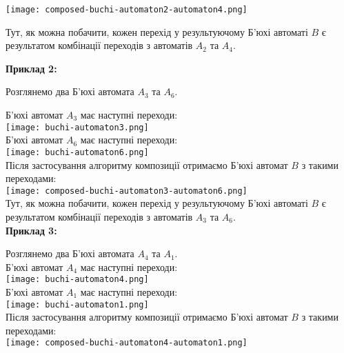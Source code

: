 \documentclass[12pt,a4paper]{article}
\begin{document}
\texttt{[image: composed-buchi-automaton2-automaton4.png]}

Тут, як можна побачити, кожен перехід у результуючому Б'юхі автоматі \(B\) є результатом комбінації переходів з автоматів \(A_2\) та \(A_4\).

\vspace{1em}
\textbf{Приклад 2:}
\vspace{0.5em}

Розглянемо два Б'юхі автомата \(A_3\) та \(A_6\).

Б'юхі автомат \(A_3\) має наступні переходи: \\
\texttt{[image: buchi-automaton3.png]} \\

Б'юхі автомат \(A_6\) має наступні переходи: \\
\texttt{[image: buchi-automaton6.png]} \\

Після застосування алгоритму композиції отримаємо Б'юхі автомат \(B\) з такими переходами: \\
\texttt{[image: composed-buchi-automaton3-automaton6.png]} \\

Тут, як можна побачити, кожен перехід у результуючому Б'юхі автоматі \(B\) є результатом комбінації переходів з автоматів \(A_3\) та \(A_6\). \\

\vspace{1em}
\textbf{Приклад 3:}
\vspace{0.5em}

Розглянемо два Б'юхі автомата \(A_4\) та \(A_1\). \\

Б'юхі автомат \(A_4\) має наступні переходи: \\
\texttt{[image: buchi-automaton4.png]} \\

Б'юхі автомат \(A_1\) має наступні переходи: \\
\texttt{[image: buchi-automaton1.png]} \\

Після застосування алгоритму композиції отримаємо Б'юхі автомат \(B\) з такими переходами: \\
\texttt{[image: composed-buchi-automaton4-automaton1.png]} \\
\end{document}
